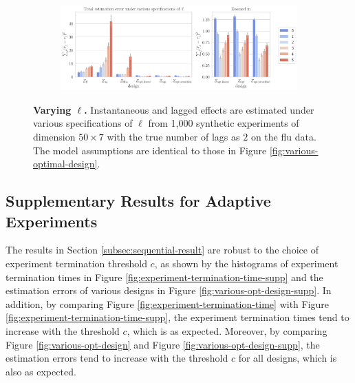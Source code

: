 \begin{figure}[H]
	\centering
	\begin{subfigure}{1.0\textwidth}
		\centering
		\includegraphics[width=1\linewidth]{plots/empirical/flu/nonadaptive/flu_N_50_T_7_varying-ell.pdf}
	\end{subfigure}
	\caption{\textbf{Varying $\ell$.} Instantaneous and lagged effects are estimated under various specifications of $\ell$ from 1,000 synthetic experiments of dimension $50\times 7$ with the true number of lags as $2$ on the flu data. The model assumptions are identical to those in Figure \ref{fig:various-optimal-design}.}
	\label{fig:varying-ell}
\end{figure}




\subsection{Supplementary Results for Adaptive Experiments}

The results in Section \ref{subsec:sequential-result} are robust to the choice of experiment termination threshold $c$, as shown by the histograms of experiment termination times in Figure \ref{fig:experiment-termination-time-supp} and the estimation errors of various designs in Figure \ref{fig:various-opt-design-supp}. In addition, by comparing Figure \ref{fig:experiment-termination-time} with Figure \ref{fig:experiment-termination-time-supp}, the experiment termination times tend to increase with the threshold $c$, which is as expected. Moreover, by comparing Figure \ref{fig:various-opt-design} and Figure \ref{fig:various-opt-design-supp}, the estimation errors tend to increase with the threshold $c$ for all designs, which is also as expected.




